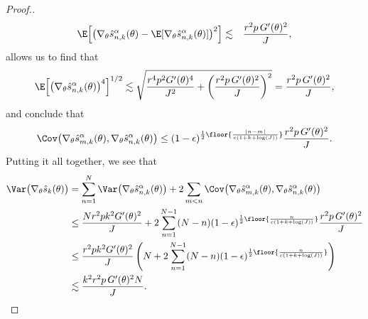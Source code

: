 \begin{proof}[Proof.]
\begin{eqnarray}
\E\Big[\big(\nabla_\theta\hat s_{n,k}^\alpha(\theta)-\E[\nabla_\theta\hat s_{n,k}^\alpha(\theta)]\big)^2\Big] &\lesssim& \frac{r^2p \, G'(\theta)^2}{J},
\end{eqnarray}
allows us to find that 
\begin{equation}
\E\Big[\big(\nabla_\theta\hat s_{n,k}^\alpha(\theta)\big)^4\Big]^{1/2} \lesssim  \sqrt{\frac{r^4p^2G'(\theta)^4}{J^2}+\left(\frac{r^2p \, G'(\theta)^2}{J}\right)^2} = \frac{r^2p \, G'(\theta)^2}{J},
\end{equation}
and conclude that 
\begin{equation}\Cov\big(\nabla_\theta\hat s_{m,k}^\alpha(\theta), \nabla_\theta\hat s_{n,k}^\alpha(\theta)\big) \leq (1-\epsilon)^{\frac{1}{2}\floor{\frac{|n-m|}{c(1+k+\log(J))}}}\frac{r^2p \, G'(\theta)^2}{J}.\end{equation}
Putting it all together, we see that
\begin{align}
    \Var\big(\nabla_\theta \hat s_{k}(\theta)\big) &= \sum_{n=1}^N \Var\big(\nabla_\theta\hat s_{n,k}^\alpha(\theta)\big) + 2\sum_{m<n} \Cov\big(\nabla_\theta\hat s_{m,k}^\alpha(\theta),\nabla_\theta\hat s_{n,k}^\alpha(\theta)\big)
    \\
    &\leq \frac{Nr^2pk^2G'(\theta)^2}{J} + 2\sum_{n=1}^{N-1} (N-n)(1-\epsilon)^{\frac{1}{2}\floor{\frac{n}{c(1+k+\log(J))}}}\frac{r^2p \, G'(\theta)^2}{J} 
    \\
    &\leq \frac{r^2pk^2G'(\theta)^2}{J} \left(N + 2\sum_{n=1}^{N-1} (N-n) (1-\epsilon)^{\frac{1}{2}\floor{\frac{n}{c(1+k+\log(J))}}}\right) 
    \\
    &\lesssim \frac{k^2r^2p \, G'(\theta)^2N}{J}.
\end{align}


\end{proof}
